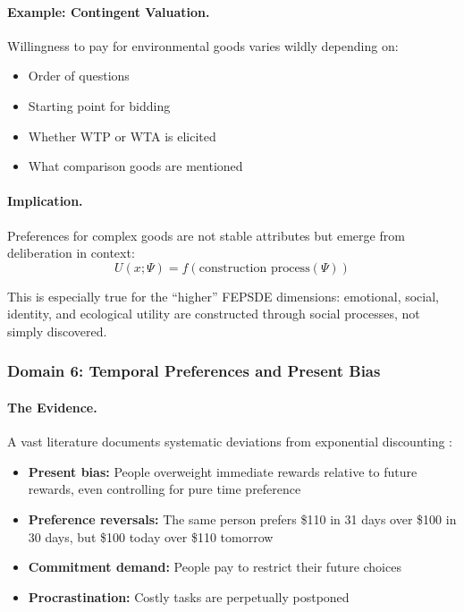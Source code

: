 \paragraph{Example: Contingent Valuation.}
Willingness to pay for environmental goods varies wildly depending on:
\begin{itemize}
  \item Order of questions
  \item Starting point for bidding
  \item Whether WTP or WTA is elicited
  \item What comparison goods are mentioned
\end{itemize}

\paragraph{Implication.}
Preferences for complex goods are not stable attributes
but emerge from deliberation in context:
\begin{equation}
  U(x; \Psi) = f(\text{construction process}(\Psi))
\end{equation}

This is especially true for the ``higher'' FEPSDE dimensions:
emotional, social, identity, and ecological utility
are constructed through social processes, not simply discovered.

\subsubsection{Domain 6: Temporal Preferences and Present Bias}

\paragraph{The Evidence.}
A vast literature documents systematic deviations from exponential discounting
\citep{frederick2002time}:
\begin{itemize}
  \item \textbf{Present bias:} People overweight immediate rewards relative to 
        future rewards, even controlling for pure time preference
  \item \textbf{Preference reversals:} The same person prefers \$110 in 31 days 
        over \$100 in 30 days, but \$100 today over \$110 tomorrow
  \item \textbf{Commitment demand:} People pay to restrict their future choices \citep{ashraf2006,bryan2010}
  \item \textbf{Procrastination:} Costly tasks are perpetually postponed
\end{itemize}

